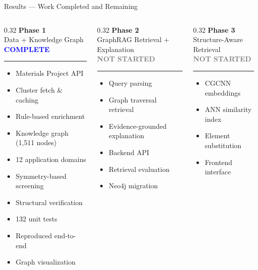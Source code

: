 \documentclass{beamer}
\begin{document}
\begin{frame}{Results --- Work Completed and Remaining}
\small
\begin{columns}[T]

\begin{column}{0.32\textwidth}
\textbf{Phase 1} \\
\footnotesize Data + Knowledge Graph \\
\textcolor{blue}{\textbf{COMPLETE}}
\rule{\linewidth}{0.4pt}
\begin{itemize}\footnotesize
\item[\checkmark] Materials Project API
\item[\checkmark] Cluster fetch \& caching
\item[\checkmark] Rule-based enrichment
\item[\checkmark] Knowledge graph (1,511 nodes)
\item[\checkmark] 12 application domains
\item[\checkmark] Symmetry-based screening
\item[\checkmark] Structural verification
\item[\checkmark] 132 unit tests
\item[\checkmark] Reproduced end-to-end
\item[\checkmark] Graph visualization
\end{itemize}
\end{column}

\begin{column}{0.32\textwidth}
\textbf{Phase 2} \\
\footnotesize GraphRAG Retrieval + Explanation \\
\textcolor{gray}{\textbf{NOT STARTED}}
\rule{\linewidth}{0.4pt}
\begin{itemize}\footnotesize
\item[$\circ$] Query parsing
\item[$\circ$] Graph traversal retrieval
\item[$\circ$] Evidence-grounded explanation
\item[$\circ$] Backend API
\item[$\circ$] Retrieval evaluation
\item[$\circ$] Neo4j migration
\end{itemize}
\end{column}

\begin{column}{0.32\textwidth}
\textbf{Phase 3} \\
\footnotesize Structure-Aware Retrieval \\
\textcolor{gray}{\textbf{NOT STARTED}}
\rule{\linewidth}{0.4pt}
\begin{itemize}\footnotesize
\item[$\circ$] CGCNN embeddings
\item[$\circ$] ANN similarity index
\item[$\circ$] Element substitution
\item[$\circ$] Frontend interface
\end{itemize}
\end{column}

\end{columns}
\end{frame}
\end{document}
